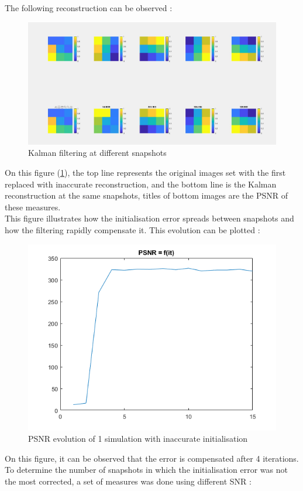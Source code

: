 \documentclass[titlepage]{article}
\begin{document}
	The following reconstruction can be observed :
	
	\begin{figure}[H]
		\centering
		\includegraphics[width=.8\linewidth]{src/K_ev}
		\caption{Kalman filtering at different snapshots}
		\label{fig:K_ev}
	\end{figure}

	On this figure (\ref{fig:K_ev}), the top line represents the original images set with the first replaced with inaccurate reconstruction, and the bottom line is the Kalman reconstruction at the same snapshots, titles of bottom images are the PSNR of these measures. \\
	
	This figure illustrates how the initialisation error spreads between snapshots and how the filtering rapidly compensate it. This evolution can be plotted :
	
	\begin{figure}[H]
		\centering
		\includegraphics[width=.5\linewidth]{src/evPSNR}
		\caption{PSNR evolution of 1 simulation with inaccurate initialisation}
	\end{figure}

	On this figure, it can be observed that the error is compensated after 4 iterations. \\
	
	To determine the number of snapshots in which the initialisation error was not the most corrected, a set of measures was done using different SNR :
	
\end{document}
